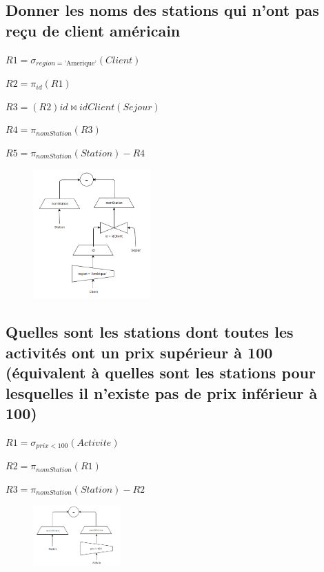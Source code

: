 \documentclass{article}
\begin{document}
\subsection{Donner les noms des stations qui n’ont pas reçu de client américain}

$ R1 = \sigma_{region = \text{'Amerique'}}(Client)$

$ R2 = \pi_{id}(R1)$

$ R3 = (R2)id \Join idClient(Sejour)$

$ R4 = \pi_{nomStation}(R3)$

$ R5 = \pi_{nomStation}(Station) - R4$

\begin{figure}[H]
  \centering
  \includegraphics[width=0.4\textwidth]{imgAlgGraph/16.png}
  \label{fig:16}
\end{figure}

\subsection{Quelles sont les stations dont toutes les activités ont un prix supérieur à 100 (équivalent à quelles sont les stations pour lesquelles il n’existe pas de prix inférieur à 100)}

$ R1 = \sigma_{prix < 100}(Activite)$

$ R2 = \pi_{nomStation}(R1)$

$ R3 = \pi_{nomStation}(Station) - R2$

\begin{figure}[H]
  \centering
  \includegraphics[width=0.3\textwidth]{imgAlgGraph/17.png}
  \label{fig:17}
\end{figure}
\end{document}
